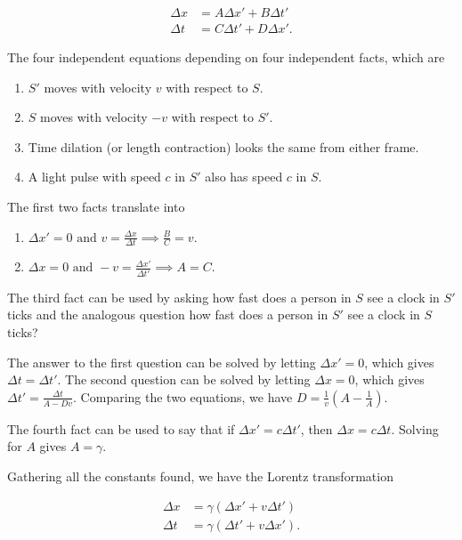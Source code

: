 \documentclass[english,a4paper,12pt]{report}
\begin{document}
\begin{equation}
    \begin{aligned}
        \Delta x &= A \Delta x' + B \Delta t' \\
        \Delta t &= C \Delta t' + D \Delta x'. 
    \end{aligned}
\end{equation}

The four independent equations depending on four independent facts, which are 

\begin{enumerate}
    \item \(S'\) moves with velocity \(v\) with respect to \(S\).
    \item \(S\)  moves with velocity \(-v\) with respect to \(S'\).
    \item Time dilation (or length contraction) looks the same from either frame.
    \item A light pulse with speed \(c\) in \(S'\) also has speed \(c\)  in \(S\).
\end{enumerate}

The first two facts translate into

\begin{enumerate}
    \item \(\displaystyle \Delta x' = 0 \text { and } v = \frac{\Delta x}{\Delta t} \implies \frac{B}{C} = v \).
    \item \(\displaystyle \Delta x = 0 \text { and } -v = \frac{\Delta x'}{\Delta t'} \implies A = C \).  
\end{enumerate}

The third fact can be used by asking how fast does a person in \(S\) see a clock in \(S'\) ticks and the analogous question how fast does a person in \(S'\) see a clock in \(S\) ticks? 

The answer to the first question can be solved by letting \(\Delta x' = 0\), which gives \(\Delta t = \Delta t'\). The second question can be solved by letting \(\Delta x = 0\), which gives \(\Delta t' = \frac{\Delta t}{A - Dv} \). Comparing the two equations, we have \(D = \frac{1}{v}(A - \frac{1}{A}) \). 

The fourth fact can be used to say that if \(\Delta x' = c \Delta t'\), then \(\Delta x = c \Delta t\). Solving for \(A\)  gives \(A = \gamma \). 

Gathering all the constants found, we have the Lorentz transformation

\begin{equation}
    \begin{aligned}
    \Delta x &= \gamma (\Delta x' + v \Delta t') \\
    \Delta t &= \gamma (\Delta t' + v \Delta x').
    \end{aligned}
\end{equation}
\end{document}
